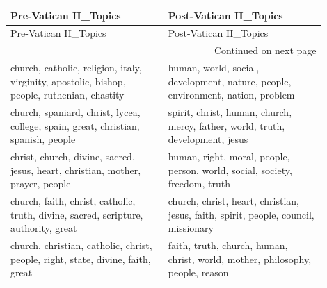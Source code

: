 \begin{longtable}{p{0.45\linewidth}p{0.45\linewidth}}
\toprule
                                                                       Pre-Vatican II_Topics &                                                              Post-Vatican II_Topics \\
\midrule
\endfirsthead

\toprule
                                                                       Pre-Vatican II_Topics &                                                              Post-Vatican II_Topics \\
\midrule
\endhead
\midrule
\multicolumn{2}{r}{{Continued on next page}} \\
\midrule
\endfoot

\bottomrule
\endlastfoot
church, catholic, religion, italy, virginity, apostolic, bishop, people, ruthenian, chastity &     human, world, social, development, nature, people, environment, nation, problem \\
          church, spaniard, christ, lycea, college, spain, great, christian, spanish, people &      spirit, christ, human, church, mercy, father, world, truth, development, jesus \\
             christ, church, divine, sacred, jesus, heart, christian, mother, prayer, people &         human, right, moral, people, person, world, social, society, freedom, truth \\
         church, faith, christ, catholic, truth, divine, sacred, scripture, authority, great & church, christ, heart, christian, jesus, faith, spirit, people, council, missionary \\
             church, christian, catholic, christ, people, right, state, divine, faith, great &      faith, truth, church, human, christ, world, mother, philosophy, people, reason \\
\end{longtable}

